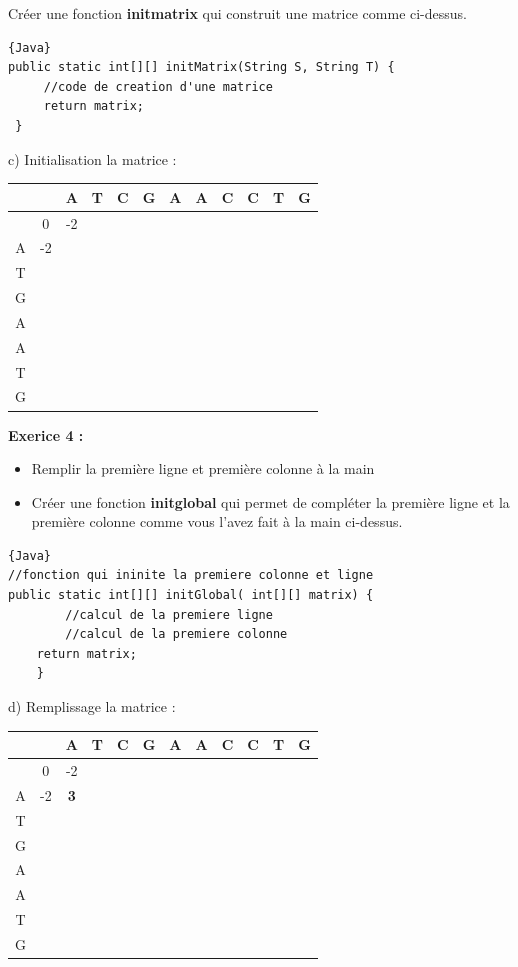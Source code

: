 \documentclass{article}
\begin{document}
Créer une fonction \textbf{initmatrix} qui construit une matrice comme ci-dessus.
\begin{lstlisting}{Java}
public static int[][] initMatrix(String S, String T) {
	 //code de creation d'une matrice
	 return matrix;
 }
\end{lstlisting}

c) Initialisation la matrice :
\begin{center}
\begin{tabular}{|c|c|c|c|c|c|c|c|c|c|c|c|}
\hline
 &&A&T&C&G&A&A&C&C&T&G\\
\hline
&0&-2& & & & & & & & & \\
\hline
A&-2& & & & & & & & & & \\
\hline
T& & & & & & & & & & & \\
\hline
G& & & & & & & & & & & \\
\hline
A& & & & & & & & & & & \\
\hline
A& & & & & & & & & & & \\
\hline
T& & & & & & & & & & & \\
\hline
G& & & & & & & & & & & \\
\hline
\end{tabular}
    \end{center}
    \medbreak
    
\textbf{Exerice 4 :}
\begin{itemize}
\item Remplir la première ligne et première colonne à la main
\item Créer une fonction \textbf{initglobal} qui permet de compléter la première ligne et la première colonne comme vous l’avez fait à la main ci-dessus.
\end{itemize}

\begin{lstlisting}{Java}
//fonction qui ininite la premiere colonne et ligne
public static int[][] initGlobal( int[][] matrix) {
		//calcul de la premiere ligne
		//calcul de la premiere colonne
	return matrix;
	}
\end{lstlisting}
\newpage

d) Remplissage la matrice :
\begin{center}
\begin{tabular}{|c|c|c|c|c|c|c|c|c|c|c|c|}
\hline
 &&A&T&C&G&A&A&C&C&T&G\\
\hline
&0&-2& & & & & & & & & \\
\hline
A&-2&\textbf{3}& & & & & & & & & \\
\hline
T& & & & & & & & & & & \\
\hline
G& & & & & & & & & & & \\
\hline
A& & & & & & & & & & & \\
\hline
A& & & & & & & & & & & \\
\hline
T& & & & & & & & & & & \\
\hline
G& & & & & & & & & & & \\
\hline
\end{tabular}
    \end{center}
    
\end{document}
